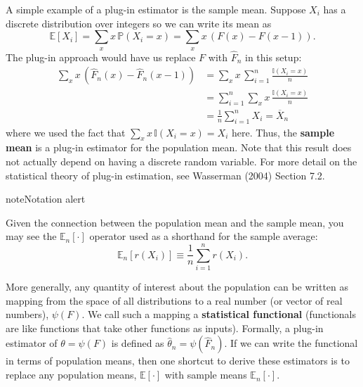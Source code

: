 \documentclass[
  13pt,
  letterpaper,
  DIV=11,
  numbers=noendperiod]{scrreprt}
\newcommand{\E}{\mathbb{E}}
\renewcommand{\P}{\mathbb{P}}
\newcommand{\Xbar}{\overline{X}}
\theoremstyle{plain}
\theoremstyle{plain}
\theoremstyle{definition}
\theoremstyle{definition}
\theoremstyle{remark}
\begin{document}
A simple example of a plug-in estimator is the sample mean. Suppose
\(X_i\) has a discrete distribution over integers so we can write its
mean as \[
\E[X_i] = \sum_{x} x\,\P(X_i = x) = \sum_{x} x\, (F(x) - F(x-1)).
\] The plug-in approach would have us replace \(F\) with
\(\widehat{F}_n\) in this setup: \[
\begin{aligned}
\sum_{x} x\, (\widehat{F}_n(x) - \widehat{F}_n(x-1)) &= \sum_{x} x\, \sum_{i=1}^n \frac{\mathbb{I}(X_i = x)}{n} \\
&=  \sum_{i=1}^n \sum_{x} x\,\frac{\mathbb{I}(X_i = x)}{n} \\
& = \frac{1}{n} \sum_{i=1}^n X_i = \Xbar_n
\end{aligned}
\] where we used the fact that \(\sum_{x} x\,\mathbb{I}(X_i = x) = X_i\)
here. Thus, the \textbf{sample mean} is a plug-in estimator for the
population mean. Note that this result does not actually depend on
having a discrete random variable. For more detail on the statistical
theory of plug-in estimation, see Wasserman (2004) Section 7.2.

\begin{bookcallout}{note}{Notation alert}

Given the connection between the population mean and the sample mean,
you may see the \(\E_n[\cdot]\) operator used as a shorthand for the
sample average: \[
\E_n[r(X_i)] \equiv \frac{1}{n} \sum_{i=1}^n r(X_i).
\]

\end{bookcallout}

More generally, any quantity of interest about the population can be
written as mapping from the space of all distributions to a real number
(or vector of real numbers), \(\psi(F)\). We call such a mapping a
\textbf{statistical functional} (functionals are like functions that
take other functions as inputs). Formally, a plug-in estimator of
\(\theta = \psi(F)\) is defined as
\(\widehat{\theta}_n = \psi(\widehat{F}_n)\). If we can write the
functional in terms of population means, then one shortcut to derive
these estimators is to replace any population means, \(\E[\cdot]\) with
sample means \(\E_n[\cdot]\).
\end{document}

